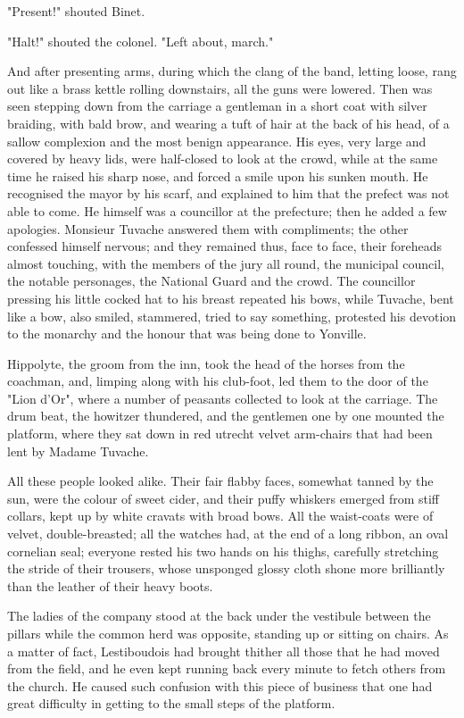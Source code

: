 \documentclass[11pt,twocolumn]{ltugboat}
\begin{document}
"Present!" shouted Binet.

"Halt!" shouted the colonel. "Left about, march."

And after presenting arms, during which the clang of the band, letting
loose, rang out like a brass kettle rolling downstairs, all the guns
were lowered. Then was seen stepping down from the carriage a gentleman
in a short coat with silver braiding, with bald brow, and wearing a tuft
of hair at the back of his head, of a sallow complexion and the most
benign appearance. His eyes, very large and covered by heavy lids, were
half-closed to look at the crowd, while at the same time he raised his
sharp nose, and forced a smile upon his sunken mouth. He recognised the
mayor by his scarf, and explained to him that the prefect was not able
to come. He himself was a councillor at the prefecture; then he added
a few apologies. Monsieur Tuvache answered them with compliments; the
other confessed himself nervous; and they remained thus, face to face,
their foreheads almost touching, with the members of the jury all round,
the municipal council, the notable personages, the National Guard and
the crowd. The councillor pressing his little cocked hat to his
breast repeated his bows, while Tuvache, bent like a bow, also smiled,
stammered, tried to say something, protested his devotion to the
monarchy and the honour that was being done to Yonville.

Hippolyte, the groom from the inn, took the head of the horses from the
coachman, and, limping along with his club-foot, led them to the door
of the "Lion d'Or", where a number of peasants collected to look at the
carriage. The drum beat, the howitzer thundered, and the gentlemen one
by one mounted the platform, where they sat down in red utrecht velvet
arm-chairs that had been lent by Madame Tuvache.

All these people looked alike. Their fair flabby faces, somewhat tanned
by the sun, were the colour of sweet cider, and their puffy whiskers
emerged from stiff collars, kept up by white cravats with broad bows.
All the waist-coats were of velvet, double-breasted; all the watches
had, at the end of a long ribbon, an oval cornelian seal; everyone
rested his two hands on his thighs, carefully stretching the stride of
their trousers, whose unsponged glossy cloth shone more brilliantly than
the leather of their heavy boots.

The ladies of the company stood at the back under the vestibule between
the pillars while the common herd was opposite, standing up or sitting
on chairs. As a matter of fact, Lestiboudois had brought thither all
those that he had moved from the field, and he even kept running back
every minute to fetch others from the church. He caused such confusion
with this piece of business that one had great difficulty in getting to
the small steps of the platform.
\end{document}
